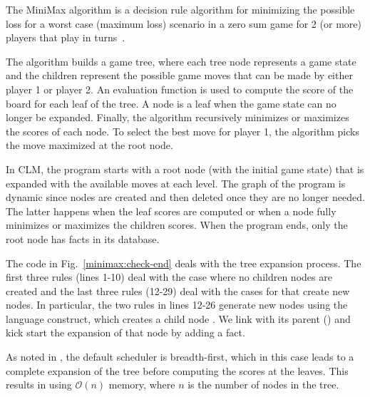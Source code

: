 The MiniMax algorithm is a decision rule algorithm for minimizing the
possible loss for a worst case (maximum loss) scenario in a zero sum
game for 2 (or more) players that play in
turns~\cite{Edwards54}.

The algorithm builds a game tree, where each tree node represents a
game state and the children represent the possible game moves that can
be made by either player 1 or player 2.  An evaluation function is
used to compute the score of the board for each leaf of the tree. A
node is a leaf when the game state can no longer be expanded. Finally,
the algorithm recursively minimizes or maximizes the scores of each
node.  To select the best move for player 1, the algorithm picks the
move maximized at the root node.

In CLM, the program starts with a root node (with the initial game state)
that is expanded with the available moves at each level. The graph of the
program is dynamic since nodes are created and then deleted once they are no
longer needed. The latter happens when the
leaf scores are computed or when a node fully minimizes or maximizes the
children scores. When the program ends, only the root node has facts in its
database.

The code in Fig.~\ref{minimax:check-end} deals with the tree expansion process.
The first three rules (lines 1-10) deal
with the case where no children nodes are created and the last three rules
(12-29) deal with the cases for that create new nodes. In particular, the two
rules in lines 12-26 generate new nodes using the
 language construct, which creates a child node 
. We link  with its parent ()
and kick start the expansion of that node  by adding a 
fact.

As noted in , the default scheduler is
breadth-first, which in this case leads to a complete expansion of the
tree before computing the scores at the leaves.  This results in using
$\mathcal{O}(n)$ memory, where $n$ is the number of nodes in the tree.

